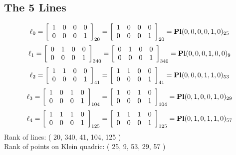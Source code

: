 \documentclass{article}
\begin{document}
{\subsection*{The 5 Lines}
$$
\ell_{0} = 
\left[
\begin{array}{*{4}{r}}
1 & 0 & 0 & 0\\
0 & 0 & 0 & 1\\
\end{array}
\right]
_{20}
=
\left[
\begin{array}{*{4}c}
1  & 0  & 0  & 0\\
0  & 0  & 0  & 1\\
\end{array}
\right]_{20}
={\rm\bf Pl}(0,0,0,0,1,0 )_{25}$$
$$
\ell_{1} = 
\left[
\begin{array}{*{4}{r}}
0 & 1 & 0 & 0\\
0 & 0 & 0 & 1\\
\end{array}
\right]
_{340}
=
\left[
\begin{array}{*{4}c}
0  & 1  & 0  & 0\\
0  & 0  & 0  & 1\\
\end{array}
\right]_{340}
={\rm\bf Pl}(0,0,0,1,0,0 )_{9}$$
$$
\ell_{2} = 
\left[
\begin{array}{*{4}{r}}
1 & 1 & 0 & 0\\
0 & 0 & 0 & 1\\
\end{array}
\right]
_{41}
=
\left[
\begin{array}{*{4}c}
1  & 1  & 0  & 0\\
0  & 0  & 0  & 1\\
\end{array}
\right]_{41}
={\rm\bf Pl}(0,0,0,1,1,0 )_{53}$$
$$
\ell_{3} = 
\left[
\begin{array}{*{4}{r}}
1 & 0 & 1 & 0\\
0 & 0 & 0 & 1\\
\end{array}
\right]
_{104}
=
\left[
\begin{array}{*{4}c}
1  & 0  & 1  & 0\\
0  & 0  & 0  & 1\\
\end{array}
\right]_{104}
={\rm\bf Pl}(0,1,0,0,1,0 )_{29}$$
$$
\ell_{4} = 
\left[
\begin{array}{*{4}{r}}
1 & 1 & 1 & 0\\
0 & 0 & 0 & 1\\
\end{array}
\right]
_{125}
=
\left[
\begin{array}{*{4}c}
1  & 1  & 1  & 0\\
0  & 0  & 0  & 1\\
\end{array}
\right]_{125}
={\rm\bf Pl}(0,1,0,1,1,0 )_{57}$$
Rank of lines: ( 20, 340, 41, 104, 125 )\\
Rank of points on Klein quadric: ( 25, 9, 53, 29, 57 )\\
}
\end{document}
